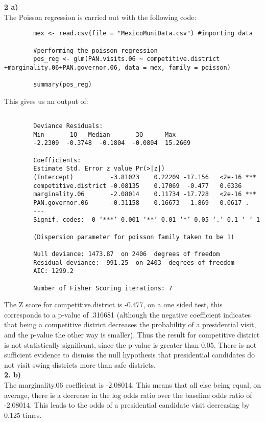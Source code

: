 \documentclass{article}
\begin{document}
	\textbf{2 a)\\}
	The Poisson regression is carried out with the following code:\\
	\begin{verbatim}
		mex <- read.csv(file = "MexicoMuniData.csv") #importing data
		
		#performing the poisson regression
		pos_reg <- glm(PAN.visits.06 ~ competitive.district +marginality.06+PAN.governor.06, data = mex, family = poisson)
		
		summary(pos_reg)
	\end{verbatim}
	This gives us an output of:
	\begin{verbatim}
			
		Deviance Residuals:
		Min       1Q   Median       3Q      Max  
		-2.2309  -0.3748  -0.1804  -0.0804  15.2669  
		
		Coefficients:
		Estimate Std. Error z value Pr(>|z|)    
		(Intercept)          -3.81023    0.22209 -17.156   <2e-16 ***
		competitive.district -0.08135    0.17069  -0.477   0.6336    
		marginality.06       -2.08014    0.11734 -17.728   <2e-16 ***
		PAN.governor.06      -0.31158    0.16673  -1.869   0.0617 .  
		---
		Signif. codes:  0 ‘***’ 0.001 ‘**’ 0.01 ‘*’ 0.05 ‘.’ 0.1 ‘ ’ 1
		
		(Dispersion parameter for poisson family taken to be 1)
		
		Null deviance: 1473.87  on 2406  degrees of freedom
		Residual deviance:  991.25  on 2403  degrees of freedom
		AIC: 1299.2
		
		Number of Fisher Scoring iterations: 7
	\end{verbatim}
The Z score for competitive.district is -0.477, on a one sided test, this corresponds to a p-value of .316681 (although the negative coefficient indicates that being a competitive district decreases the probability of a presidential visit, and the p-value the other way is smaller). Thus the result for competitive district is not statistically significant, since the p-value is greater than 0.05. There is not sufficient evidence to dismiss the null hypothesis that presidential candidates do not visit swing districts more than safe districts.\\
\textbf{2. b)\\}
The marginality.06 coefficient is -2.08014. This means that all else being equal, on average, there is a decrease in the log odds ratio over the baseline odds ratio of -2.08014. This leads to the odds of a presidential candidate visit decreasing by 0.125 times.\\
\end{document}
